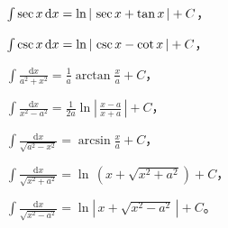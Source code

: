 \documentclass[UTF8]{ctexart}
\begin{document}
\begin{tabenum}[(1)]
    \item $ \int \sec x \,\mathrm{d} x =\ln |\,\sec x +\tan x\,|+C $，
    \item $ \int \csc x \,\mathrm{d} x =\ln |\,\csc x -\cot x\,|+C $，\\
    \item $ \int \frac{\mathrm{d}x}{a^2+x^2} =\frac{1}{a}\arctan \frac{x}{a}+C $，\\
    \item $ \int \frac{\mathrm{d}x}{x^2-a^2} =\frac{1}{2a}\ln |\,\frac{x-a}{x+a}\,|+C $，\\
    \item $ \int \frac{\mathrm{d}x}{\sqrt{a^2-x^2}} =\arcsin \frac{x}{a}+C $，\\
    \item $ \int \frac{\mathrm{d}x}{\sqrt{x^2+a^2}} =\ln \,(x+\sqrt{x^2+a^2})+C $，\\
    \item $ \int \frac{\mathrm{d}x}{\sqrt{x^2-a^2}} =\ln |\,x+\sqrt{x^2-a^2}\,|+C $。\\
  \end{tabenum}
\end{document}
